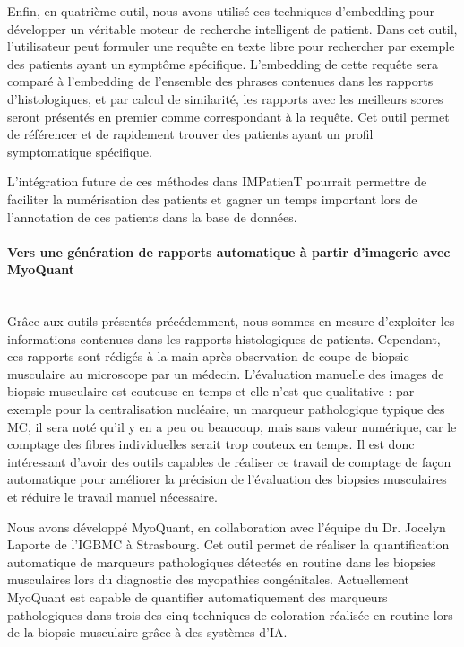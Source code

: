 Enfin, en quatrième outil, nous avons utilisé ces techniques d’embedding pour développer un véritable moteur de recherche intelligent de patient. Dans cet outil, l’utilisateur peut formuler une requête en texte libre pour rechercher par exemple des patients ayant un symptôme spécifique. L’embedding de cette requête sera comparé à l’embedding de l’ensemble des phrases contenues dans les rapports d’histologiques, et par calcul de similarité, les rapports avec les meilleurs scores seront présentés en premier comme correspondant à la requête. Cet outil permet de référencer et de rapidement trouver des patients ayant un profil symptomatique spécifique.

L’intégration future de ces méthodes dans IMPatienT pourrait permettre de faciliter la numérisation des patients et gagner un temps important lors de l’annotation de ces patients dans la base de données.

\paragraph{\textbf{Vers une génération de rapports automatique à partir d’imagerie avec MyoQuant}}\mbox{}\\

Grâce aux outils présentés précédemment, nous sommes en mesure d’exploiter les informations contenues dans les rapports histologiques de patients. Cependant, ces rapports sont rédigés à la main après observation de coupe de biopsie musculaire au microscope par un médecin. L’évaluation manuelle des images de biopsie musculaire est couteuse en temps et elle n’est que qualitative : par exemple pour la centralisation nucléaire, un marqueur pathologique typique des MC, il sera noté qu’il y en a peu ou beaucoup, mais sans valeur numérique, car le comptage des fibres individuelles serait trop couteux en temps. Il est donc intéressant d’avoir des outils capables de réaliser ce travail de comptage de façon automatique pour améliorer la précision de l’évaluation des biopsies musculaires et réduire le travail manuel nécessaire.

Nous avons développé MyoQuant, en collaboration avec l’équipe du Dr. Jocelyn Laporte de l’IGBMC à Strasbourg. Cet outil permet de réaliser la quantification automatique de marqueurs pathologiques détectés en routine dans les biopsies musculaires lors du diagnostic des myopathies congénitales. Actuellement MyoQuant est capable de quantifier automatiquement des marqueurs pathologiques dans trois des cinq techniques de coloration réalisée en routine lors de la biopsie musculaire grâce à des systèmes d’IA.

